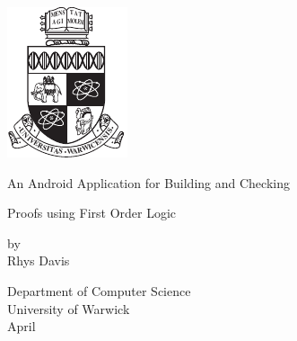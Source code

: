 \thispagestyle{empty}

\begin{spacing}{2}
	\begin{center}
		\includegraphics[scale = 1.9]{Preamble/WarwickCrest.pdf}
	\end{center}
	\begin{center}
		An Android Application for Building and Checking

		Proofs using First Order Logic
		\vspace{5mm}
	\end{center}
	\begin{center}
		by
		\\Rhys Davis
		\vspace{20mm}
	\end{center}
	\begin{center}
		Department of Computer Science
		\\ University of Warwick
		\\ April 
	\end{center}
\end{spacing}


